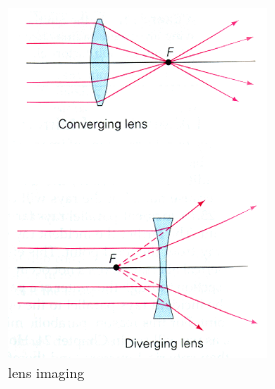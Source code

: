 %
%
%
%

\begin{figure}
  \centering
  \includegraphics[width=2.7in]{fig/lenses.png}
  \caption{lens imaging}\label{fig_lens_imaging}
\end{figure}

